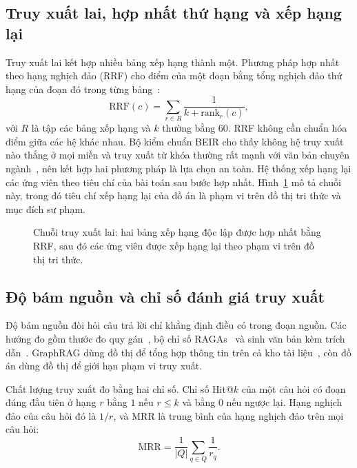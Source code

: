 \subsection{Truy xuất lai, hợp nhất thứ hạng và xếp hạng lại}
Truy xuất lai kết hợp nhiều bảng xếp hạng thành một. Phương pháp hợp nhất theo hạng nghịch đảo (RRF) cho điểm của một đoạn bằng tổng nghịch đảo thứ hạng của đoạn đó trong từng bảng~\cite{cormack2009}:
\begin{equation}
\mathrm{RRF}(c)=\sum_{r\in R}\frac{1}{k+\mathrm{rank}_r(c)},
\label{eq:rrf}
\end{equation}
với $R$ là tập các bảng xếp hạng và $k$ thường bằng $60$. RRF không cần chuẩn hóa điểm giữa các hệ khác nhau. Bộ kiểm chuẩn BEIR cho thấy không hệ truy xuất nào thắng ở mọi miền và truy xuất từ khóa thường rất mạnh với văn bản chuyên ngành~\cite{thakur2021}, nên kết hợp hai phương pháp là lựa chọn an toàn. Hệ thống xếp hạng lại các ứng viên theo tiêu chí của bài toán sau bước hợp nhất. Hình~\ref{fig:hybrid-retrieval} mô tả chuỗi này, trong đó tiêu chí xếp hạng lại của đồ án là phạm vi trên đồ thị tri thức và mục đích sư phạm.

\begin{figure}[ht]
\centering

\caption{Chuỗi truy xuất lai: hai bảng xếp hạng độc lập được hợp nhất bằng RRF, sau đó các ứng viên được xếp hạng lại theo phạm vi trên đồ thị tri thức.}
\label{fig:hybrid-retrieval}
\end{figure}

\subsection{Độ bám nguồn và chỉ số đánh giá truy xuất}
Độ bám nguồn đòi hỏi câu trả lời chỉ khẳng định điều có trong đoạn nguồn. Các hướng đo gồm thước đo quy gán~\cite{rashkin2023}, bộ chỉ số RAGAs~\cite{es2024} và sinh văn bản kèm trích dẫn~\cite{gao2023alce}. GraphRAG dùng đồ thị để tổng hợp thông tin trên cả kho tài liệu~\cite{edge2024}, còn đồ án dùng đồ thị để giới hạn phạm vi truy xuất.

Chất lượng truy xuất đo bằng hai chỉ số. Chỉ số Hit@$k$ của một câu hỏi có đoạn đúng đầu tiên ở hạng $r$ bằng $1$ nếu $r\le k$ và bằng $0$ nếu ngược lại. Hạng nghịch đảo của câu hỏi đó là $1/r$, và MRR là trung bình của hạng nghịch đảo trên mọi câu hỏi:
\begin{equation}
\mathrm{MRR}=\frac{1}{|Q|}\sum_{q\in Q}\frac{1}{r_q}.
\label{eq:mrr}
\end{equation}
